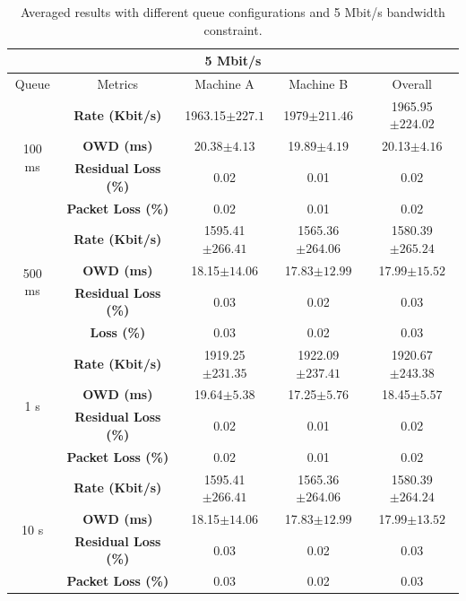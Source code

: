 \begin{table}[h]
\begin{center}
\begin{tabular}{ |c|c|c|c|c| }
\hline
\multicolumn{5}{|c|}{\textbf{5 Mbit/s}} \\ \hline
 Queue & Metrics & Machine A & Machine B & Overall\\ \hline
\multirow{4}{*}{100 ms} & \textbf{Rate (Kbit/s)} & 1963.15$\pm227.1$ & 1979$\pm211.46$ & 1965.95$\pm224.02$\\ \cline{2-5}
 & \textbf{OWD (ms)} &  20.38$\pm4.13$ & 19.89$\pm4.19$ & 20.13$\pm4.16$ \\ \cline{2-5}
 & \textbf{Residual Loss (\%)} & 0.02 & 0.01 & 0.02 \\ \cline{2-5}
 & \textbf{Packet Loss (\%)} & 0.02 & 0.01 & 0.02 \\ \hline
\multirow{4}{*}{500 ms} & \textbf{Rate (Kbit/s)} & 1595.41$\pm266.41$ & 1565.36$\pm264.06$ & 1580.39$\pm265.24$\\ \cline{2-5}
 & \textbf{OWD (ms)} & 18.15$\pm14.06$ & 17.83$\pm12.99$ & 17.99$\pm15.52$ \\ \cline{2-5}
 & \textbf{Residual Loss (\%)} & 0.03 & 0.02 & 0.03 \\ \cline{2-5}
 & \textbf{Loss (\%)} & 0.03 & 0.02 & 0.03 \\ \hline
\multirow{4}{*}{1 s} & \textbf{Rate (Kbit/s)} & 1919.25$\pm231.35$ & 1922.09$\pm237.41$ & 1920.67$\pm243.38$\\ \cline{2-5}
 & \textbf{OWD (ms)} & 19.64$\pm5.38$ & 17.25$\pm5.76$ & 18.45$\pm5.57$ \\ \cline{2-5}
 & \textbf{Residual Loss (\%)} & 0.02 & 0.01 & 0.02 \\ \cline{2-5}
 & \textbf{Packet Loss (\%)} & 0.02 & 0.01 & 0.02 \\ \hline
\multirow{4}{*}{10 s} & \textbf{Rate (Kbit/s)} & 1595.41$\pm266.41$ & 1565.36$\pm264.06$ & 1580.39$\pm264.24$\\ \cline{2-5}
 & \textbf{OWD (ms)} & 18.15$\pm14.06$ & 17.83$\pm12.99$ & 17.99$\pm13.52$ \\ \cline{2-5}
 & \textbf{Residual Loss (\%)} & 0.03 & 0.02 & 0.03 \\ \cline{2-5}
 & \textbf{Packet Loss (\%)} & 0.03 & 0.02 & 0.03 \\ \hline
\end{tabular}
    \caption[Averaged results with different queue configurations and 5 Mbit/s bandwidth constraint]{Averaged results with different queue configurations and 5 Mbit/s bandwidth constraint.}
    \label{fig:5mbit_queue}
\end{center}
\end{table}

